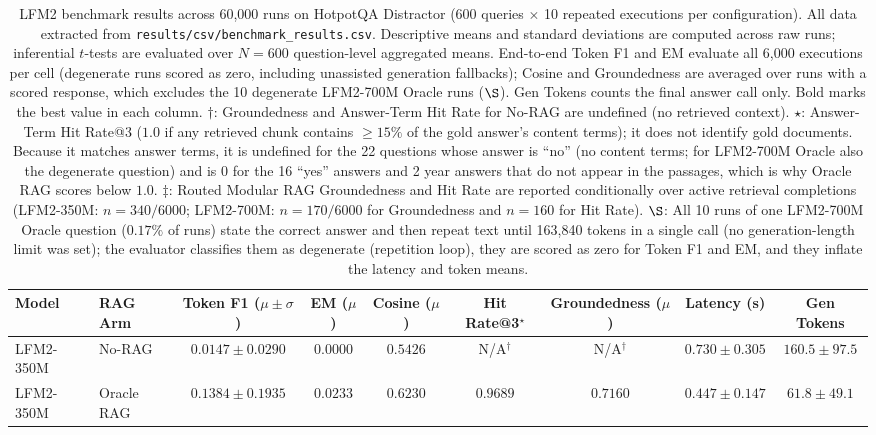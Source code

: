 \documentclass[10pt]{article}
\begin{document}
\begin{table}[t]
\centering
\caption{LFM2 benchmark results across 60,000 runs on HotpotQA Distractor \citep{yang2018hotpotqa} (600 queries $\times$ 10 repeated executions per configuration). All data extracted from \texttt{results/csv/benchmark\_results.csv}. Descriptive means and standard deviations are computed across raw runs; inferential $t$-tests are evaluated over $N=600$ question-level aggregated means. End-to-end Token F1 and EM evaluate all 6,000 executions per cell (degenerate runs scored as zero, including unassisted generation fallbacks); Cosine and Groundedness are averaged over runs with a scored response, which excludes the 10 degenerate LFM2-700M Oracle runs ($\S$). Gen Tokens counts the final answer call only. Bold marks the best value in each column. $\dagger$: Groundedness and Answer-Term Hit Rate for No-RAG are undefined (no retrieved context). $\star$: Answer-Term Hit Rate@3 ($1.0$ if any retrieved chunk contains $\ge 15\%$ of the gold answer's content terms); it does not identify gold documents. Because it matches answer terms, it is undefined for the 22 questions whose answer is ``no'' (no content terms; for LFM2-700M Oracle also the degenerate question) and is $0$ for the 16 ``yes'' answers and 2 year answers that do not appear in the passages, which is why Oracle RAG scores below $1.0$. $\ddagger$: Routed Modular RAG Groundedness and Hit Rate are reported conditionally over active retrieval completions (LFM2-350M: $n=340/6000$; LFM2-700M: $n=170/6000$ for Groundedness and $n=160$ for Hit Rate). $\S$: All 10 runs of one LFM2-700M Oracle question ($0.17\%$ of runs) state the correct answer and then repeat text until 163,840 tokens in a single call (no generation-length limit was set); the evaluator classifies them as degenerate (repetition loop), they are scored as zero for Token F1 and EM, and they inflate the latency and token means.}
\label{tab:main_results}
\tiny
\setlength{\tabcolsep}{2.0pt}
\begin{tabular}{llccccccc}
\toprule
\textbf{Model} & \textbf{RAG Arm} & \textbf{Token F1 ($\mu \pm \sigma$)} & \textbf{EM ($\mu$)} & \textbf{Cosine ($\mu$)} & \textbf{Hit Rate@3$^{\star}$} & \textbf{Groundedness ($\mu$)} & \textbf{Latency (s)} & \textbf{Gen Tokens} \\
\midrule
LFM2-350M & No-RAG & $0.0147 \pm 0.0290$ & $0.0000$ & $0.5426$ & N/A$^{\dagger}$ & N/A$^{\dagger}$ & $0.730 \pm 0.305$ & $160.5 \pm 97.5$ \\
LFM2-350M & Oracle RAG & $\mathbf{0.1384 \pm 0.1935}$ & $0.0233$ & $0.6230$ & $\mathbf{0.9689}$ & $0.7160$ & $\mathbf{0.447 \pm 0.147}$ & $61.8 \pm 49.1$ \\

\end{tabular}
\end{table}
\end{document}
